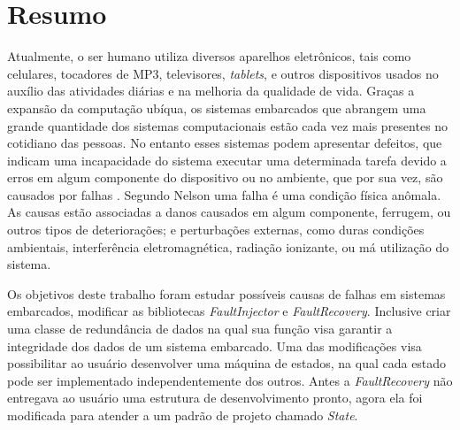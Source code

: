 
\chapter*{Resumo}

Atualmente, o ser humano utiliza diversos aparelhos eletrônicos, tais como celulares, tocadores de MP3, televisores, \textit{tablets}, e outros dispositivos usados no auxílio das atividades diárias e na melhoria da qualidade de vida. Graças a expansão da computação ubíqua, os sistemas embarcados que abrangem uma grande quantidade dos sistemas computacionais estão cada vez mais presentes no cotidiano das pessoas. No entanto esses sistemas podem apresentar defeitos, que indicam uma incapacidade do sistema executar uma determinada tarefa devido a erros em algum componente do dispositivo ou no ambiente, que por sua vez, são causados por falhas \cite{Nelson:1990}. Segundo Nelson \cite{Nelson:1990} uma falha é uma condição física anômala. As causas estão associadas a danos causados em algum componente, ferrugem, ou outros tipos de deteriorações; e perturbações externas, como duras condições ambientais, interferência eletromagnética, radiação ionizante, ou má utilização do sistema.

Os objetivos deste trabalho foram estudar possíveis causas de falhas em sistemas embarcados, modificar as bibliotecas \textit{FaultInjector} e \textit{FaultRecovery}. Inclusive criar uma classe de redundância de dados na qual sua função visa garantir a integridade dos dados de um sistema embarcado. Uma das modificações visa possibilitar ao usuário desenvolver uma máquina de estados, na qual cada estado pode ser implementado independentemente dos outros. Antes a \textit{FaultRecovery} não entregava ao usuário uma estrutura de desenvolvimento pronto, agora ela foi modificada para atender a um padrão de projeto chamado \textit{State}.

